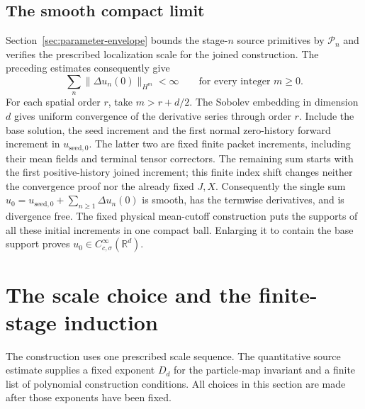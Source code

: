 \documentclass[11pt]{article}
\newcommand{\R}{\mathbb R}
\theoremstyle{definition}
\begin{document}
\subsection{The smooth compact limit}
Section~\ref{sec:parameter-envelope} bounds the stage-$n$ source
primitives by $\mathcal P_n$ and verifies the prescribed localization
scale for the joined construction. The preceding estimates consequently give
\[
 \sum_n\|\Delta u_n(0)\|_{H^m}<\infty
 \qquad\text{for every integer }m\ge0.
\]
For each spatial order $r$, take $m>r+d/2$. The Sobolev
embedding in dimension $d$ gives uniform convergence of the derivative
series through order $r$. Include the base solution, the seed increment and
the first normal zero-history forward increment in $u_{\mathrm{seed},0}$.
The latter two are fixed finite packet increments, including their
mean fields and terminal tensor correctors. The remaining sum starts
with the first positive-history joined increment; this finite index
shift changes neither the convergence proof nor the already fixed
$J,X$. Consequently the single sum
$u_0=u_{\mathrm{seed},0}+\sum_{n\geq1}\Delta u_n(0)$ is smooth, has the termwise
derivatives, and is divergence free. The fixed physical mean-cutoff
construction puts the supports of all these initial increments
in one compact ball. Enlarging it to contain the base support proves
$u_0\in C^\infty_{c,\sigma}(\R^d)$.
\section{The scale choice and the finite-stage induction}
\label{sec:iteration}
The construction uses one prescribed scale sequence. The quantitative source estimate supplies a fixed exponent $D_d$
for the particle-map invariant and a finite list of polynomial construction
conditions. All choices in this section are made after those exponents have
been fixed.
\end{document}
